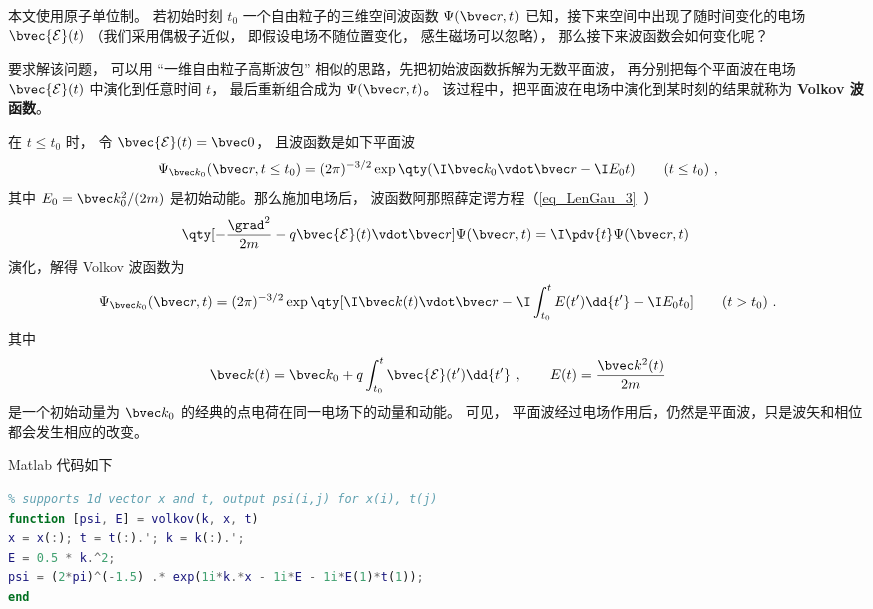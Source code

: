 
本文使用原子单位制。 若初始时刻 $t_0$ 一个自由粒子的三维空间波函数 $\Psi(\bvec r,t)$ 已知，接下来空间中出现了随时间变化的电场 $\bvec {\mathcal E}(t)$ （我们采用偶极子近似， 即假设电场不随位置变化， 感生磁场可以忽略）， 那么接下来波函数会如何变化呢？

要求解该问题， 可以用 “一维自由粒子高斯波包” 相似的思路，先把初始波函数拆解为无数平面波， 再分别把每个平面波在电场 $\bvec {\mathcal E}(t)$ 中演化到任意时间 $t$， 最后重新组合成为 $\Psi(\bvec r,t)$。 该过程中，把平面波在电场中演化到某时刻的结果就称为 \textbf{Volkov 波函数}。

在 $t \le t_0$ 时， 令 $\bvec {\mathcal E}(t) = \bvec 0$， 且波函数是如下平面波
\begin{equation}\label{eq_Volkov_3}
\Psi_{\bvec k_0}(\bvec r, t \le t_0) = (2\pi)^{-3/2} \exp\qty(\I\bvec k_0 \vdot \bvec r - \I E_0 t) \qquad (t \le t_0)~,
\end{equation}
其中 $E_0 = \bvec k_0^2/(2m)$ 是初始动能。那么施加电场后，
波函数阿那照薛定谔方程（\autoref{eq_LenGau_3}~）
\begin{equation}
\qty[-\frac{\grad^2}{2m} - q \bvec {\mathcal E}(t) \vdot \bvec r] \Psi(\bvec r,t) = \I \pdv{t} \Psi(\bvec r,t)~
\end{equation}
演化，解得 Volkov 波函数为
\begin{equation}\label{eq_Volkov_4}
\Psi_{\bvec k_0}(\bvec r, t) = (2\pi)^{-3/2} \exp\qty[\I \bvec k(t)\vdot \bvec r - \I\int_{t_0}^t E(t') \dd{t'} - \I E_0 t_0] \qquad (t > t_0)~.
\end{equation}
其中
\begin{equation}\label{eq_Volkov_5}
\bvec k(t) = \bvec k_0 + q\int_{t_0}^t \bvec {\mathcal E}(t') \dd{t'}~,
\qquad
E(t) = \frac{\bvec k^2(t)}{2m}
\end{equation}
是一个初始动量为 $\bvec k_0$ 的经典的点电荷在同一电场下的动量和动能。 可见， 平面波经过电场作用后，仍然是平面波，只是波矢和相位都会发生相应的改变。

Matlab 代码如下
\begin{lstlisting}[language=matlab, caption=volkov.m]
% Volkov wave function in 1D
% supports 1d vector x and t, output psi(i,j) for x(i), t(j)
function [psi, E] = volkov(k, x, t)
x = x(:); t = t(:).'; k = k(:).';
E = 0.5 * k.^2;
psi = (2*pi)^(-1.5) .* exp(1i*k.*x - 1i*E - 1i*E(1)*t(1));
end
\end{lstlisting}

